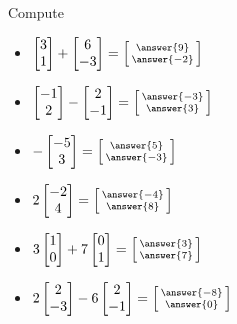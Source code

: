 \documentclass{ximera}
\begin{document}
\begin{exercise}%
    Compute
    \begin{itemize}
        \item $\begin{bmatrix} 3 \\ 1 \end{bmatrix} + \begin{bmatrix} 6 \\ -3 \end{bmatrix} = \left[\begin{smallmatrix} \answer{9} \\ \answer{-2} \end{smallmatrix}\right]$
        \item $\begin{bmatrix} -1 \\ 2 \end{bmatrix} - \begin{bmatrix} 2 \\ -1 \end{bmatrix} = \left[\begin{smallmatrix} \answer{-3} \\ \answer{3} \end{smallmatrix}\right]$
        \item $-\begin{bmatrix} -5 \\ 3 \end{bmatrix} = \left[\begin{smallmatrix} \answer{5} \\ \answer{-3} \end{smallmatrix}\right]$
        \item $2\begin{bmatrix} -2 \\ 4 \end{bmatrix} = \left[\begin{smallmatrix} \answer{-4} \\ \answer{8} \end{smallmatrix}\right]$
        \item $3\begin{bmatrix} 1 \\ 0 \end{bmatrix} + 7 \begin{bmatrix} 0 \\ 1 \end{bmatrix} = \left[\begin{smallmatrix} \answer{3} \\ \answer{7} \end{smallmatrix}\right]$
        \item $2\begin{bmatrix} 2 \\ -3 \end{bmatrix} - 6 \begin{bmatrix} 2 \\ -1 \end{bmatrix} = \left[\begin{smallmatrix} \answer{-8} \\ \answer{0} \end{smallmatrix}\right]$
    \end{itemize}
\end{exercise}
\end{document}

